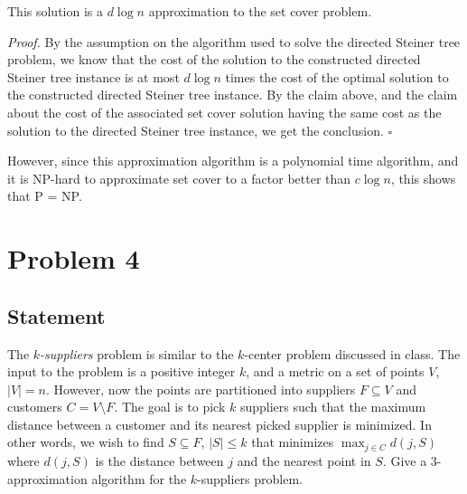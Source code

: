 \documentclass[a4paper]{article}
\newenvironment{proof}{\begin{breakbox}\textit{Proof.}}{\hfill$\square$\end{breakbox}}
\begin{document}
\begin{claim}
    This solution is a $d \log n$ approximation to the set cover problem.
\end{claim}

\begin{proof}
    By the assumption on the algorithm used to solve the directed Steiner tree problem, we know that the cost of the solution to the constructed directed Steiner tree instance is at most $d \log n$ times the cost of
    the optimal solution to the constructed directed Steiner tree instance. By the claim above, and the claim about the cost of the associated set cover solution having the same cost as the
    solution to the directed Steiner tree instance, we get the conclusion.
\end{proof}

However, since this approximation algorithm is a polynomial time algorithm, and it is NP-hard to approximate set cover to a factor better than $c \log n$, this shows that P = NP.
\newpage

\section{Problem 4}
\subsection{Statement}
The \emph{$k$-suppliers} problem is similar to the $k$-center problem discussed in class. The input to the problem is a positive integer $k$, and a metric on a set of points $V$, $|V| = n$. However,
now the points are partitioned into suppliers $F \subseteq V$ and customers $C = V \setminus F$. The goal is to pick $k$ suppliers such that the maximum distance between a customer and its nearest picked
supplier is minimized. In other words, we wish to find $S \subseteq F$, $|S| \le k$ that minimizes $\max_{j \in C} d(j, S)$ where $d(j, S)$ is the distance between $j$ and the nearest point in $S$.
Give a $3$-approximation algorithm for the $k$-suppliers problem.
\end{document}
